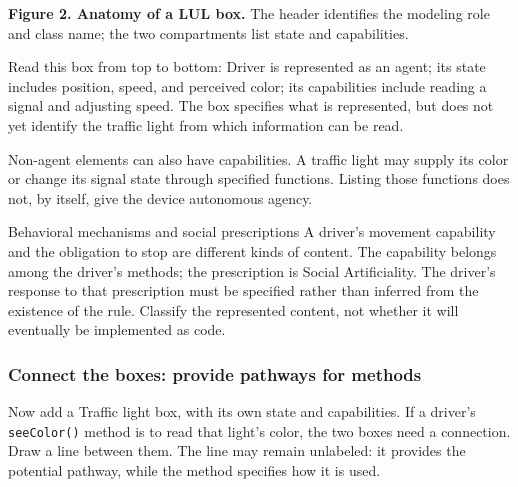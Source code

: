 \documentclass[11pt,a4paper]{article}
\newcommand{\stereo}[1]{\texttt{\guillemotleft #1\guillemotright}}
\begin{document}
\begin{center}
\end{center}

{\small\textbf{Figure 2. Anatomy of a LUL box.} The header identifies the modeling role and class name; the two compartments list state and capabilities.}

Read this box from top to bottom: Driver is represented as an agent; its state includes position, speed, and perceived color; its capabilities include reading a signal and adjusting speed. The box specifies what is represented, but does not yet identify the traffic light from which information can be read.

Non-agent elements can also have capabilities. A traffic light may supply its color or change its signal state through specified functions. Listing those functions does not, by itself, give the device autonomous agency.

\begin{principle}{Behavioral mechanisms and social prescriptions}
A driver's movement capability and the obligation to stop are different kinds of content. The capability belongs among the driver's methods; the prescription is Social Artificiality. The driver's response to that prescription must be specified rather than inferred from the existence of the rule. Classify the represented content, not whether it will eventually be implemented as code.
\end{principle}

\subsubsection{Connect the boxes: provide pathways for methods}

Now add a Traffic light box, with its own state and capabilities. If a driver's \texttt{seeColor()} method is to read that light's color, the two boxes need a connection. Draw a line between them. The line may remain unlabeled: it provides the potential pathway, while the method specifies how it is used.
\end{document}
